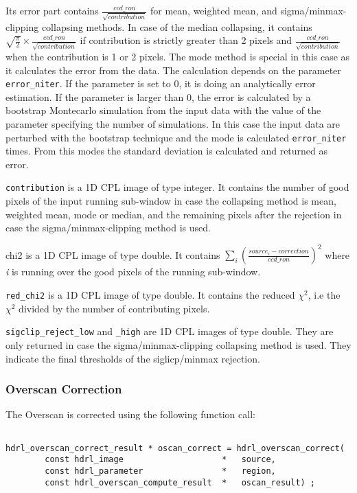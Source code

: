 Its error part contains $\frac{ccd\_ron}{\sqrt{contribution}}$ for
mean, weighted mean, and sigma/minmax-clipping collapsing methods.  In
case of the median collapsing, it contains
$\sqrt{\frac{\pi}{2}}\times\frac{ccd\_ron}{\sqrt{contribution}}$ if
contribution is strictly greater than 2 pixels and
$\frac{ccd\_ron}{\sqrt{contribution}}$ when the contribution is 1 or 2
pixels.  The mode method is special in this case as it
calculates the error from the data. The calculation depends
on the parameter \verb+error_niter+. If the parameter is set to 0, it
is doing an analytically error estimation. If the parameter is larger
than 0, the error is calculated by a bootstrap Montecarlo simulation
from the input data with the value of the parameter specifying the
number of simulations. In this case the input data are perturbed with
the bootstrap technique and the mode is calculated \verb+error_niter+
times. From this modes the standard deviation is calculated and
returned as error.

\verb+contribution+ is a 1D CPL image of type integer.  It contains
the number of good pixels of the input running sub-window in case the
collapsing method is mean, weighted mean, mode or median, and the remaining
pixels after the rejection in case the sigma/minmax-clipping method is
used.

chi2 is a 1D CPL image of type double.
It contains $\sum_i{(\frac{source_i - correction}{ccd\_ron})^2}$
where {\it i} is running over the good pixels of the running sub-window.

\verb+red_chi2+ is a 1D CPL image of type double.
It contains the reduced $\chi^{2}$, i.e the $\chi^{2}$ divided by the number of
contributing pixels.

\verb+sigclip_reject_low+ and \verb+_high+ are 1D CPL images of type
double.  They are only returned in case the sigma/minmax-clipping
collapsing method is used.  They indicate the final thresholds of the
siglicp/minmax rejection.

\subsubsection{Overscan Correction}

The Overscan is corrected using the following function call:

\begin{lstlisting}

hdrl_overscan_correct_result * oscan_correct = hdrl_overscan_correct(
        const hdrl_image                    *   source,
        const hdrl_parameter                *   region,
        const hdrl_overscan_compute_result  *   oscan_result) ;
\end{lstlisting}

